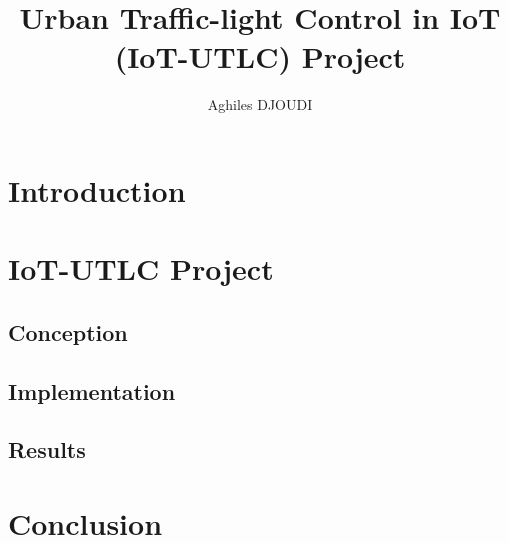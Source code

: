 \documentclass[8pt]{beamer}
\begin{document}
\title{Urban Traffic-light Control in IoT (IoT-UTLC) Project}
\author{Aghiles DJOUDI}

\firstpage

\section{Introduction}
	
\tableofcontent

\section{IoT-UTLC Project}
	\subsection{Conception}
		

	\subsection{Implementation}
		
		
	\subsection{Results}
		

\section{Conclusion}
	

\alltableofcontent

\frameBibliography
\end{document}
